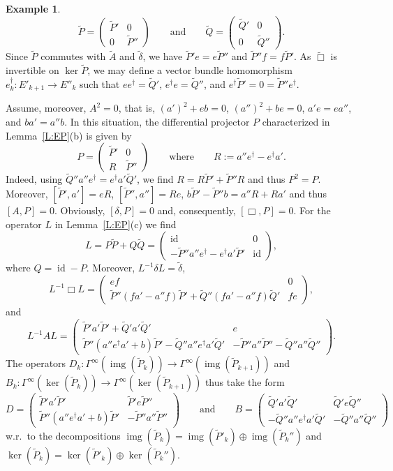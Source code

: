 \documentclass[reqno,12pt]{amsart}
\DeclareMathOperator{\img}{img}
\DeclareMathOperator{\id}{id}
\newcommand\R{\mathbb R}
\theoremstyle{plain}
\theoremstyle{definition}
\newtheorem{example}[theorem]{Example}
\begin{document}
\begin{example}
$$
\tilde P=\begin{pmatrix}\tilde P'&0\\0&\tilde P''\end{pmatrix}
\qquad\text{and}\qquad
\tilde Q=\begin{pmatrix}\tilde Q'&0\\0&\tilde Q''\end{pmatrix}.
$$
Since $\tilde P$ commutes with $\tilde A$ and $\tilde\delta$, we have
$\tilde P'e=e\tilde P''$ and $\tilde P''f=f\tilde P'$.
As $\tilde\Box$ is invertible on $\ker\tilde P$, we may define a vector bundle homomorphism $e_k^\dag\colon E'_{k+1}\to E''_k$ such that $ee^\dag=\tilde Q'$, $e^\dag e=\tilde Q''$, and $e^\dag\tilde P'=0=\tilde P''e^\dag$.

Assume, moreover, $A^2=0$, that is, $(a')^2+eb=0$, $(a'')^2+be=0$, $a'e=ea''$, and $ba'=a''b$.
In this situation, the differential projector $P$ characterized in Lemma~\ref{L:EP}(b) is given by
$$
P=\begin{pmatrix}\tilde P'&0\\R&\tilde P''\end{pmatrix}
\qquad\text{where}\qquad
R:=a''e^\dag-e^\dag a'.
$$
Indeed, using $\tilde Q''a''e^\dag=e^\dag a'\tilde Q'$, we find $R=R\tilde P'+\tilde P''R$ and thus $P^2=P$.
Moreover, $[\tilde P',a']=eR$, $[\tilde P'',a'']=Re$, $b\tilde P'-\tilde P''b=a''R+Ra'$ and thus $[A,P]=0$. 
Obviously, $[\delta,P]=0$ and, consequently, $[\Box,P]=0$.
For the operator $L$ in Lemma~\ref{L:EP}(c) we find
$$
L=P\tilde P+Q\tilde Q=\begin{pmatrix}\id&0\\-\tilde P''a''e^\dag-e^\dag a'\tilde P'&\id\end{pmatrix},
$$
where $Q=\id-P$.
Moreover, $L^{-1}\delta L=\tilde\delta$,
$$
L^{-1}\Box L=\begin{pmatrix}ef&0\\\tilde P''(fa'-a''f)\tilde P'+\tilde Q''(fa'-a''f)\tilde Q'&fe\end{pmatrix},
$$
and
$$
L^{-1}AL=\begin{pmatrix}\tilde P'a'\tilde P'+\tilde Q'a'\tilde Q'&e
\\\tilde P''(a''e^\dag a'+b)\tilde P'-\tilde Q''a''e^\dag a'\tilde Q'&-\tilde P''a''\tilde P''-\tilde Q''a''\tilde Q''\end{pmatrix}.
$$
The operators $D_k\colon\Gamma^\infty(\img(\tilde P_k))\to\Gamma^\infty(\img(\tilde P_{k+1}))$ and $B_k\colon\Gamma^\infty(\ker(\tilde P_k))\to\Gamma^\infty(\ker(\tilde P_{k+1}))$ thus take the form
$$
D=\begin{pmatrix}\tilde P'a'\tilde P'&\tilde P'e\tilde P''
\\\tilde P''(a''e^\dag a'+b)\tilde P'&-\tilde P''a''\tilde P''\end{pmatrix}
\qquad\text{and}\qquad
B=\begin{pmatrix}\tilde Q'a'\tilde Q'&\tilde Q'e\tilde Q''
\\-\tilde Q''a''e^\dag a'\tilde Q'&-\tilde Q''a''\tilde Q''\end{pmatrix}
$$
w.r.\ to the decompositions $\img(\tilde P_k)=\img(\tilde P'_k)\oplus\img(\tilde P_k'')$ and $\ker(\tilde P_k)=\ker(\tilde P'_k)\oplus\ker(\tilde P_k'')$.
\end{example}
\end{document}
